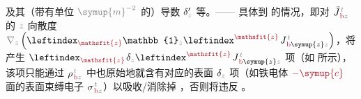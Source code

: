 及其（带有单位 $\mathcolor{gray}{\symup{m}^{-2}}$ 的）导数 $\delta'_{\mathcolor{gray}{z}}$ 等。—— 具体到  的情况，即对 $\bar{J}^{\;\!\mathcolor{gray}{t}}_{\;\!\textcolor{Maroon}{\text{b}}\mathcolor{gray}{z}}$ 的 $\mathcolor{gray}{z}$ 向散度 $\mathcolor{gray}{\nabla_z} \left( \leftindex_{\textcolor{Maroon}{\mathsfit{z}}} {\mathbb{1}}_{\mathcolor{gray}{z}} \leftindex^{\textcolor{Maroon}{\mathsfit{z}}} \;\! J^{\;\!\mathcolor{gray}{t}}_{\;\!\textcolor{Maroon}{\text{b}} \symup{z} \mathcolor{gray}{z}} \right)$，将产生 $\leftindex_{\textcolor{Maroon}{\mathsfit{z}}} \;\! \delta_{\mathcolor{gray}{z}} \leftindex^{\textcolor{Maroon}{\mathsfit{z}}} \;\! J^{\;\!\mathcolor{gray}{t}}_{\;\!\textcolor{Maroon}{\text{b}} \symup{z} \mathcolor{gray}{z}}$ 项（如  所示），该项只能通过 ${\rho}^{\;\!\mathcolor{gray}{t}}_{\;\!\textcolor{Maroon}{\text{b}}\mathcolor{gray}{z}}$ 中也原始地就含有对应的表面 $\delta_{\mathcolor{gray}{z}}$ 项（如铁电体 $\textcolor{Maroon}{-\symup{c}}$ 面的表面束缚电子 ${\sigma}^{\;\!\mathcolor{gray}{t}}_{\;\!\textcolor{Maroon}{\text{b}}\mathcolor{gray}{z}}$）以吸收/消除掉 \cite{grahamMultipoleSolutionMacroscopic2000}，否则将违反 。


